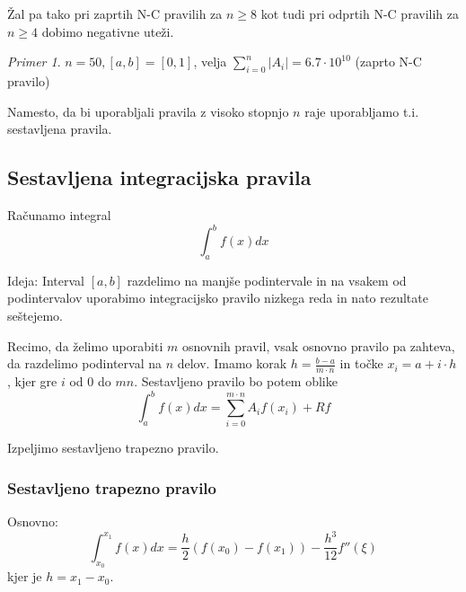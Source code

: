 \documentclass[a4paper,12pt]{article}
\theoremstyle{definition}
\theoremstyle{remark}
\newtheorem*{ex}{Primer}
\begin{document}
Žal pa tako pri zaprtih N-C pravilih za $n \geq 8$ kot tudi pri odprtih N-C pravilih za $n \geq 4$ dobimo negativne uteži.

\begin{ex}
    $n = 50, [a, b] = [0, 1]$, velja $\sum_{i=0}^{n} |A_i| = 6.7 \cdot 10^{10}$ (zaprto N-C pravilo)
\end{ex}

Namesto, da bi uporabljali pravila z visoko stopnjo $n$ raje uporabljamo t.i. sestavljena pravila.
\subsection{Sestavljena integracijska pravila}
Računamo integral
\begin{equation*}
    \int_{a}^{b} f(x) dx
\end{equation*}

Ideja: Interval $[a, b]$ razdelimo na manjše podintervale in na vsakem od podintervalov uporabimo integracijsko pravilo nizkega reda in nato 
rezultate seštejemo.

Recimo, da želimo uporabiti $m$ osnovnih pravil, vsak osnovno pravilo pa zahteva, da razdelimo podinterval na $n$ delov.
Imamo korak $h = \frac{b-a}{m \cdot n}$ in točke $x_i = a + i\cdot h$, kjer gre $i$ od $0$ do $mn$.
Sestavljeno pravilo bo potem oblike
\begin{equation*}
    \int_{a}^{b} f(x) dx = \sum_{i = 0}^{m \cdot n} A_i f(x_i) + Rf
\end{equation*}

Izpeljimo sestavljeno trapezno pravilo.
\subsubsection{Sestavljeno trapezno pravilo}

Osnovno:
\begin{equation*}
    \int_{x_0}^{x_1} f(x) dx = \frac{h}{2} (f(x_0) - f(x_1)) - \frac{h^3}{12} f''(\xi)
\end{equation*}
kjer je $h = x_1 - x_0$.
\end{document}
